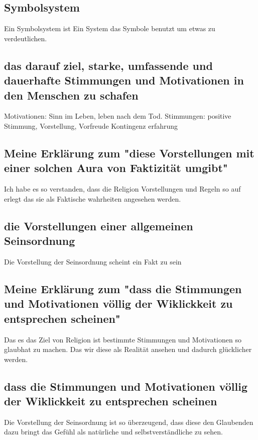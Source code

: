 \documentclass{article}
\begin{document}
\subsection{Symbolsystem}
Ein Symbolsystem ist Ein System das Symbole benutzt um etwas zu verdeutlichen.

\subsection{das darauf ziel, starke, umfassende und dauerhafte Stimmungen und Motivationen in den Menschen zu schafen}
\begin{flushleft}
Motivationen: Sinn im Leben, leben nach dem Tod. \linebreak 
Stimmungen: positive Stimmung, Vorstellung, Vorfreude \linebreak
Kontingenz erfahrung
\end{flushleft}

\subsection{Meine Erklärung zum "diese Vorstellungen mit einer solchen Aura von Faktizität umgibt"}
Ich habe es so verstanden, dass die Religion Vorstellungen und Regeln so auf erlegt das sie als Faktische wahrheiten angesehen werden.

\subsection{die Vorstellungen einer allgemeinen Seinsordnung}
Die Vorstellung der Seinsordnung scheint ein Fakt zu sein

\subsection{Meine Erklärung zum "dass die Stimmungen und Motivationen völlig der Wiklickkeit zu entsprechen scheinen"}
Das es das Ziel von Religion ist bestimmte Stimmungen und Motivationen so glaubhat zu machen.
Das wir diese als Realität ansehen und dadurch glücklicher werden.

\subsection{dass die Stimmungen und Motivationen völlig der Wiklickkeit zu entsprechen scheinen}
Die Vorstellung der Seinsordnung ist so überzeugend, dass diese den Glaubenden dazu bringt
das Gefühl als natürliche und selbstverständliche zu sehen.
\end{document}
